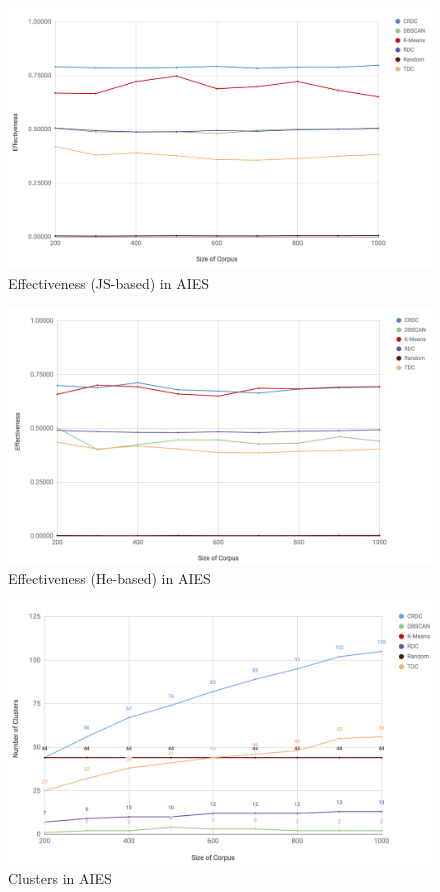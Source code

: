 \begin{figure}[!htb]\centering
  \center
  \includegraphics[scale=0.35]{effectivenessJS.png}
  \caption{Effectiveness (JS-based) in AIES}
  \label{fig:effectivenessJS}
\end{figure}

\begin{figure}[!htb]\centering
  \center
  \includegraphics[scale=0.35]{effectivenessHe.png}
  \caption{Effectiveness (He-based) in AIES}
  \label{fig:effectivenessHe}
\end{figure}

\begin{figure}[!htb]\centering
  \center
  \includegraphics[scale=0.45]{clusters.png}
  \caption{Clusters in AIES}
  \label{fig:clusters}
\end{figure}

